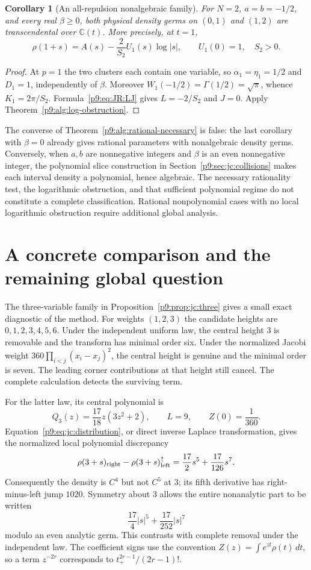 \documentclass[11pt,a4paper]{article}
\newtheorem{corollary}[theorem]{Corollary}
\theoremstyle{definition}
\theoremstyle{remark}
\newcommand{\C}{\mathbb C}
\numberwithin{equation}{section}
\begin{document}
\begin{corollary}[An all-repulsion nonalgebraic family]
\label{p9:alg:arcsine-family}
For $N=2$, $a=b=-1/2$, and every real $\beta\ge0$, both physical
density germs on $(0,1)$ and $(1,2)$ are transcendental over $\C(t)$.
More precisely, at $t=1$,
\[
 \rho(1+s)=A(s)-\frac{2}{S_2}U_1(s)\log|s|,
       \qquad U_1(0)=1,\quad S_2>0.
\]
\end{corollary}
\begin{proof}
At $p=1$ the two clusters each contain one variable, so
$\alpha_1=\eta_1=1/2$ and $D_1=1$, independently of $\beta$.
Moreover $W_1(-1/2)=\Gamma(1/2)=\sqrt\pi$, whence
$K_1=2\pi/S_2$. Formula~\eqref{p9:eq:JR:LJ} gives $L=-2/S_2$
and $J=0$. Apply Theorem~\ref{p9:alg:log-obstruction}.
\end{proof}

The converse of Theorem~\ref{p9:alg:rational-necessary} is false: the
last corollary with $\beta=0$ already gives rational parameters with
nonalgebraic density germs. Conversely, when $a,b$ are nonnegative
integers and $\beta$ is an even nonnegative integer, the polynomial
slice construction in Section~\ref{p9:sec:jc:collisions} makes each interval
density a polynomial, hence algebraic. The necessary rationality test,
the logarithmic obstruction, and that sufficient polynomial regime do
not constitute a complete classification. Rational nonpolynomial cases
with no local logarithmic obstruction require additional global analysis.


\section{A concrete comparison and the remaining global question}

The three-variable family in Proposition~\ref{p9:prop:jc:three} gives a
small exact diagnostic of the method. For weights $(1,2,3)$ the
candidate heights are $0,1,2,3,4,5,6$. Under the independent uniform
law, the central height $3$ is removable and the transform has minimal
order six. Under the normalized Jacobi weight
$360\prod_{i<j}(x_i-x_j)^2$, the central height is genuine and the
minimal order is seven. The leading corner contributions at that
height still cancel. The complete calculation detects the surviving
term.

For the latter law, its central polynomial is
\[
 Q_3(z)=\frac{17}{18}z(3z^2+2),\qquad L=9,\qquad Z(0)=\frac1{360}.
\]
Equation~\eqref{p9:eq:jc:distribution}, or direct inverse Laplace
transformation, gives the normalized local polynomial discrepancy
\[
 \rho(3+s)_{\rm right}-\rho(3+s)_{\rm left}^{\uparrow}
       =\frac{17}{2}s^5+\frac{17}{126}s^7.
\]
Consequently the density is $C^4$ but not $C^5$ at $3$; its fifth
derivative has right-minus-left jump $1020$. Symmetry about $3$
allows the entire nonanalytic part to be written
\[
       \frac{17}{4}|s|^5+\frac{17}{252}|s|^7
\]
modulo an even analytic germ. This contrasts with complete removal
under the independent law. The coefficient signs use the convention
$Z(z)=\int e^{zt}\rho(t)\,dt$, so a term $z^{-2r}$ corresponds to
$t_+^{2r-1}/(2r-1)!$.
\end{document}
